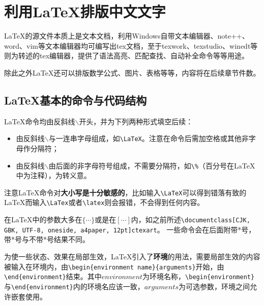 \section{利用\LaTeX 排版中文文字}
\LaTeX 的源文件本质上是文本文档，利用Windows自带文本编辑器、note++、word、vim等文本编辑器均可编写出tex文档，至于texwork、texstudio、winedt等则为转述的tex编辑器，提供了语法高亮、匹配查找、自动补全命令等等用途。

除此之外\LaTeX 还可以排版数学公式、图片、表格等等，内容将在后续章节件数。
\subsection{\LaTeX 基本的命令与代码结构}
\LaTeX 命令均由反斜线$\backslash$开头，并为下列两种形式填空后续：
\begin{itemize}
\item 由反斜线$\backslash$与一连串字母组成，如\verb|\LaTeX|。注意在命令后需加空格或其他非字母作分隔符；
\item 由反斜线$\backslash$由后面的非字母符号组成，不需要分隔符，如\verb|\%|（百分号在\LaTeX 中为注释），为转义意。
\end{itemize}

注意\LaTeX 命令对\textbf{大小写是十分敏感的}，比如输入\verb|\LaTeX|可以得到错落有致的\LaTeX 而输入\verb|\LaTex|或者\verb|\latex|则会报错，不会得到任何内容。

在\LaTeX 中的参数大多在$\{\cdots\}$或是在$[\cdots]$内，如之前所述\verb|\documentclass|\texttt{[CJK, GBK, UTF-8, oneside, a4paper, 12pt]{ctexart}}。
一些命令会在后面附带*号，带*号与不带*号结果不同。

为使一些状态、效果在局部生效，\LaTeX 引入了\textbf{环境}的用法，需要局部生效的内容被输入在环境内，由\verb|\begin{environment name}{arguments}|开始，由\verb|\end{environment}|结束。其中$environment$为环境名称，\verb|\begin{environment}|与\verb|\end{environment}|内的环境名应该一致，$arguments$为可选参数，环境之间允许嵌套使用。

